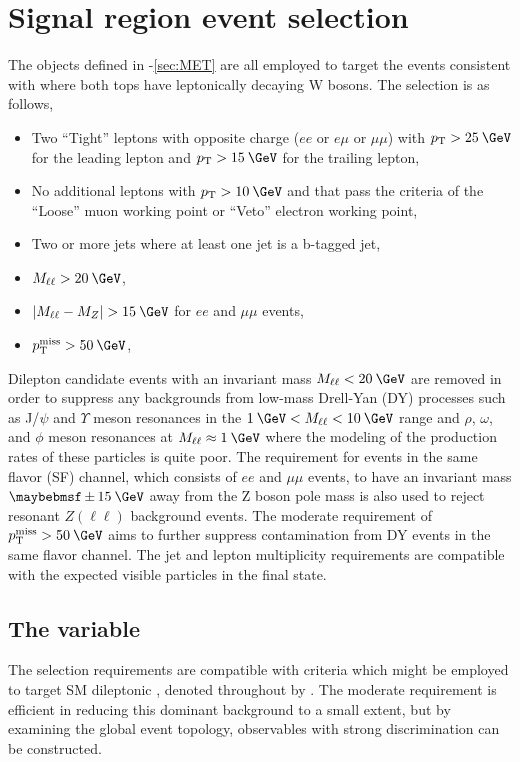 \section{Signal region event selection}
\label{sec:selection}

The objects defined in -\ref{sec:MET} are all employed to target the events consistent with \ttMET where both tops have leptonically decaying W bosons. The selection is as follows,

\begin{itemize}
\item Two ``Tight'' leptons with opposite charge ($ee$ or $e\mu$ or $\mu\mu$) with $\pt>25\:\GeV$ for 
the leading lepton and $\pt>15\:\GeV$ for the trailing lepton,
\item No additional leptons with $\pt>10\:\GeV$ and that pass the criteria of the ``Loose'' muon working point or ``Veto'' electron working point,
\item Two or more jets where at least one jet is a b-tagged jet,
\item $M_{\ell\ell}>20\:\GeV$,
\item $|M_{\ell\ell} - M_Z|>15\:\GeV$ for $ee$ and $\mu\mu$ events,
\item $\ptmiss>50\:\GeV$,
\end{itemize}

Dilepton candidate events with an invariant mass $M_{\ell\ell}<20\:\GeV$ are removed in order to suppress any backgrounds from low-mass Drell-Yan (DY) processes such as J/$\psi$ and $\Upsilon$ meson resonances in the $1\:\GeV<M_{\ell\ell}<10\:\GeV$ range and $\rho$, $\omega$, and $\phi$ meson resonances at $M_{\ell\ell}\approx 1\:\GeV$ where the modeling of the production rates of these particles is quite poor. The requirement for events in the same flavor (SF) channel, which consists of $ee$ and $\mu\mu$ events, to have an invariant mass $\pm15\:\GeV$ away from the Z boson pole mass is also used to reject resonant $Z(\ell\ell)$ background events. The moderate requirement of $\MET>50\:\GeV$ aims to further suppress contamination from DY events in the same flavor channel. The jet and lepton multiplicity requirements are compatible with the expected visible particles in the final state.

\subsection{The \mttll variable}
\label{subsec:mt2ll}

The selection requirements are compatible with criteria which might be employed to target SM dileptonic \ttbar, denoted throughout by \ttll. The moderate \MET requirement is efficient in reducing this dominant background to a small extent, but by examining the global \ttbar event topology, observables with strong discrimination can be constructed.

